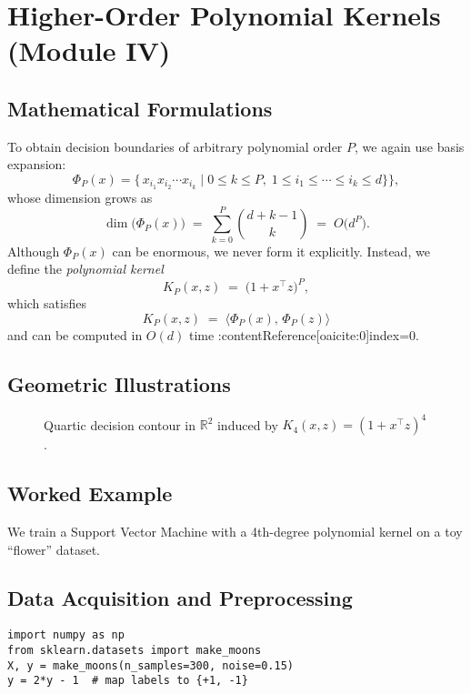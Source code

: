 \documentclass[11pt]{article}
\begin{document}
\section{Higher-Order Polynomial Kernels (Module IV)}

\subsection{Mathematical Formulations}
To obtain decision boundaries of arbitrary polynomial order $P$, we again use basis expansion:
\[
\Phi_P(x) = \bigl\{\,x_{i_1}x_{i_2}\cdots x_{i_k}\mid 0 \le k \le P,\;1\le i_1\le \cdots\le i_k\le d\}\bigr\},
\]
whose dimension grows as
\[
\dim\bigl(\Phi_P(x)\bigr) \;=\;\sum_{k=0}^P \binom{d + k - 1}{k}
\;=\;O\bigl(d^P\bigr).
\]
Although $\Phi_P(x)$ can be enormous, we never form it explicitly.  Instead, we define the \emph{polynomial kernel}
\[
K_P(x,z) \;=\;\bigl(1 + x^\top z\bigr)^P,
\]
which satisfies
\[
K_P(x,z)\;=\;\langle \Phi_P(x),\,\Phi_P(z)\rangle
\]
and can be computed in $O(d)$ time :contentReference[oaicite:0]{index=0}.

\subsection{Geometric Illustrations}
\begin{figure}[h]
  \centering
  \caption{Quartic decision contour in $\mathbb{R}^2$ induced by $K_4(x,z)=(1+x^\top z)^4$.}
\end{figure}

\subsection{Worked Example}
We train a Support Vector Machine with a 4th-degree polynomial kernel on a toy “flower” dataset.

\subsection{Data Acquisition and Preprocessing}
\begin{lstlisting}
import numpy as np
from sklearn.datasets import make_moons
X, y = make_moons(n_samples=300, noise=0.15)
y = 2*y - 1  # map labels to {+1, -1}
\end{lstlisting}
\end{document}
